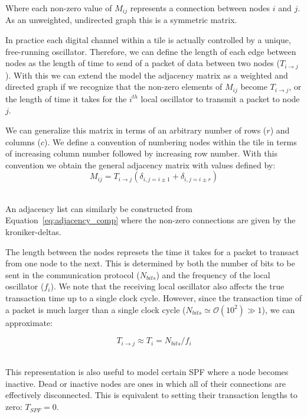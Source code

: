 Where each non-zero value of $M_{ij}$ represents a connection between nodes $i$ and $j$.
As an unweighted, undirected graph this is a symmetric matrix.

In practice each digital channel within a tile is actually controlled by a unique, free-running oscillator.
Therefore, we can define the length of each edge between nodes as the length of time to send of a packet of data between two nodes ($T_{i\rightarrow j}$).
With this we can extend the model the adjacency matrix as a weighted and directed graph if we recognize that the non-zero elements of $M_{ij}$ become $T_{i\rightarrow j}$, or the length of time it takes for the $i^{th}$ local oscillator to transmit a packet to node $j$.

We can generalize this matrix in terms of an arbitrary number of rows ($r$) and columns ($c$).
We define a convention of numbering nodes within the tile in terms of increasing column number followed by increasing row number.
With this convention we obtain the general adjacency matrix with values defined by:
\begin{equation}
  M_{ij} = T_{i\rightarrow j}(\delta_{i,j=i\pm 1} + \delta_{i,j=i\pm r})
\end{equation}~\label{eq:adjacency_comp}

An adjacency list can similarly be constructed from Equation~\ref{eq:adjacency_comp} where the non-zero connections are given by the kroniker-deltas.

The length between the nodes represets the time it takes for a packet to transact from one node to the next.
This is determined by both the number of bits to be sent in the communication protocol ($N_{bits}$) and the frequency of the local oscillator ($f_{i}$).
We note that the receiving local oscillator also affects the true transaction time up to a single clock cycle.
However, since the transaction time of a packet is much larger than a single clock cycle ($N_{bits} \simeq \mathcal{O}(10^{2}) \gg 1$), we can approximate:

\begin{equation}
T_{i\rightarrow j} \approx T_{i} = N_{bits}/f_{i}
\end{equation}~\label{eq:t_packet}

This representation is also useful to model certain SPF where a node becomes inactive.
Dead or inactive nodes are ones in which all of their connections are effectively disconnected.
This is equivalent to setting their transaction lengths to zero: $T_{SPF} = 0$.

